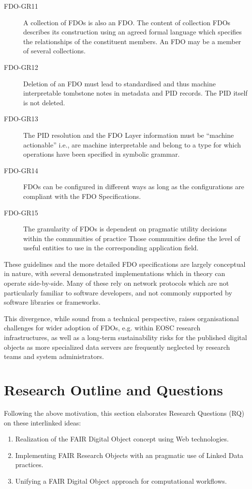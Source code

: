 \begin{description}
\item[FDO-GR11] A collection of FDOs is also an FDO.  The content of collection FDOs describes its construction using an agreed formal language which specifies the relationships of the constituent members.  An FDO may be a member of several collections. 
\item[FDO-GR12] Deletion of an FDO must lead to standardised and thus machine interpretable tombstone notes in metadata and PID records.  The PID itself is not deleted.
\item[FDO-GR13] The PID resolution and the FDO Layer information must be “machine actionable” i.e., are machine interpretable and belong to a type for which operations have been specified in symbolic grammar. 
\item[FDO-GR14] FDOs can be configured in different ways as long as the configurations are compliant with the FDO Specifications. 
\item[FDO-GR15] The granularity of FDOs is dependent on pragmatic utility decisions within the communities of practice Those communities define the level of useful entities to use in the corresponding application field.
\end{description}

These guidelines and the more detailed FDO specifications \cite{Ivonne 2023} are largely conceptual in nature, with several demonstrated implementations \cite{Wittenburg 2022a,Lannom 2022a} which in theory can operate side-by-side. Many of these rely on network protocols \cite{Reilly 2009,Sun 2003a} which are not particularly familiar to software developers, and not commonly supported by software libraries or frameworks.

This divergence, while sound from a technical perspective, raises organisational challenges for wider adoption of FDOs, e.g. within EOSC research infrastructures, as well as a long-term sustainability risks for the published digital objects as more specialized data servers are frequently neglected by research teams and system administrators. %


\section{Research Outline and Questions}
\label{intro:outline}

Following the above motivation, this section elaborates Research Questions (RQ) on these interlinked ideas:

\begin{enumerate}
    \item Realization of the FAIR Digital Object concept using Web technologies.
    \item Implementing FAIR Research Objects with an pragmatic use of Linked Data practices.
    \item Unifying a FAIR Digital Object approach for computational workflows.
\end{enumerate}

